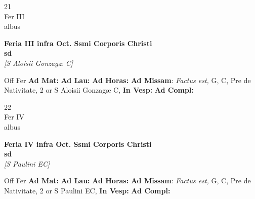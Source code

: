 \documentclass[10pt, openany]{book}
\begin{document}
        \begin{center}
            \begin{minipage}{3.5in}
                \vspace{2em}
                \begin{minipage}{0.5in}
                    {\Huge 21} \\
                    {\normalsize Fer III} \\
                    {\normalsize albus}
                \end{minipage}
                \begin{minipage}{3.0in}
                    \textbf{ \large Feria III infra Oct. Ssmi Corporis Christi \\
                    \textnormal{\normalsize sd}} \\ \textit{[S Aloisii Gonzagæ C]} \\ 
                \end{minipage}
                \begin{justify}Off Fer
                    \textbf{Ad Mat: }
                    \textbf{Ad Lau: }
                    \textbf{Ad Horas: }\textbf{Ad Missam}: \textit{Factus est,} G, C, Pre de Nativitate, 2 or S Aloisii Gonzagæ C,  
                    \textbf{In Vesp: }
                    \textbf{Ad Compl: }
                \end{justify}
            \end{minipage}
        \end{center}
    
        \begin{center}
            \begin{minipage}{3.5in}
                \vspace{2em}
                \begin{minipage}{0.5in}
                    {\Huge 22} \\
                    {\normalsize Fer IV} \\
                    {\normalsize albus}
                \end{minipage}
                \begin{minipage}{3.0in}
                    \textbf{ \large Feria IV infra Oct. Ssmi Corporis Christi \\
                    \textnormal{\normalsize sd}} \\ \textit{[S Paulini EC]} \\ 
                \end{minipage}
                \begin{justify}Off Fer
                    \textbf{Ad Mat: }
                    \textbf{Ad Lau: }
                    \textbf{Ad Horas: }\textbf{Ad Missam}: \textit{Factus est,} G, C, Pre de Nativitate, 2 or S Paulini EC,  
                    \textbf{In Vesp: }
                    \textbf{Ad Compl: }
                \end{justify}
            \end{minipage}
        \end{center}
    
\end{document}

